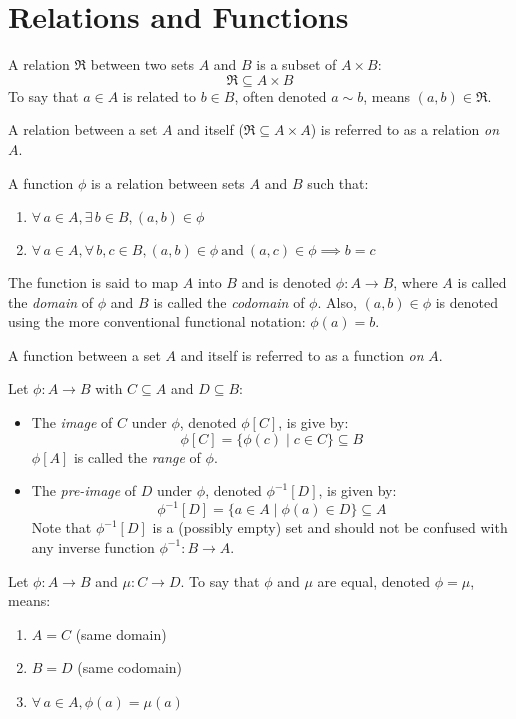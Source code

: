 \documentclass[letterpaper,12pt,fleqn]{article}
\begin{document}
\section*{Relations and Functions}
\begin{definition}
A relation $\Re$ between two sets $A$ and $B$ is a subset of $A\times B$:
\[\Re\subseteq A\times B\]
To say that $a\in A$ is related to $b\in B$, often denoted $a\sim b$, means
$(a,b)\in\Re$.

A relation between a set $A$ and itself ($\Re\subseteq A\times A$) is referred
to as a relation \emph{on} $A$.
\end{definition}
\begin{definition}
A function $\phi$ is a relation between sets $A$ and $B$ such that:
\begin{enumerate}
\item $\forall\,a\in A,\exists\,b\in B,(a,b)\in\phi$
\item $\forall\,a\in A,\forall\,b,c\in B,(a,b)\in\phi\ \mbox{and}\ (a,c)\in\phi
    \implies b=c$
\end{enumerate}
The function is said to map $A$ into $B$ and is denoted $\phi:A\to B$, where $A$
is called the \emph{domain} of $\phi$ and $B$ is called the \emph{codomain} of
$\phi$. Also, $(a,b)\in\phi$ is denoted using the more conventional functional
notation: $\phi(a)=b$.

A function between a set $A$ and itself is referred to as a function \emph{on}
$A$.
\end{definition}
\begin{definition}
Let $\phi:A\to B$ with $C\subseteq A$ and $D\subseteq B$:
\begin{itemize}
\item The \emph{image} of $C$ under $\phi$, denoted $\phi[C]$, is give by:
\[\phi[C]=\{\phi(c)\mid c\in C\}\subseteq B\]
$\phi[A]$ is called the \emph{range} of $\phi$.

\item The \emph{pre-image} of $D$ under $\phi$, denoted $\phi^{-1}[D]$, is given
by:
\[\phi^{-1}[D]=\{a\in A\mid\phi(a)\in D\}\subseteq A\]
Note that $\phi^{-1}[D]$ is a (possibly empty) set and should not be confused
with any inverse function $\phi^{-1}:B\to A$.
\end{itemize}
\end{definition}
\begin{definition}
Let $\phi:A\to B$ and $\mu:C\to D$. To say that $\phi$ and $\mu$ are equal,
denoted $\phi=\mu$, means:
\begin{enumerate}
\item $A=C$ (same domain)
\item $B=D$ (same codomain)
\item $\forall\,a\in A,\phi(a)=\mu(a)$
\end{enumerate}
\end{definition}
\end{document}
